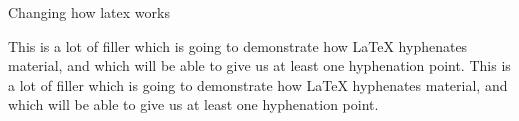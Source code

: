 \documentclass{article}
\begin{document}
Changing how latex works

This is a lot of filler which is going to demonstrate how LaTeX hyphenates
material, and which will be able to give us at least one hyphenation point.
This is a lot of filler which is going to demonstrate how LaTeX hyphenates
material, and which will be able to give us at least one hyphenation point.
\end{document}
